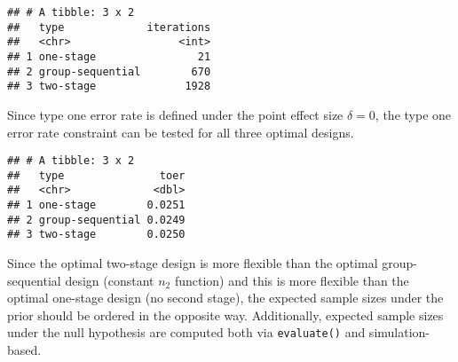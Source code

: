 \documentclass[]{book}
\newenvironment{Shaded}{\begin{snugshade}}{\end{snugshade}}
\newcommand{\DataTypeTok}[1]{\textcolor[rgb]{0.13,0.29,0.53}{#1}}
\newcommand{\DecValTok}[1]{\textcolor[rgb]{0.00,0.00,0.81}{#1}}
\newcommand{\FloatTok}[1]{\textcolor[rgb]{0.00,0.00,0.81}{#1}}
\newcommand{\KeywordTok}[1]{\textcolor[rgb]{0.13,0.29,0.53}{\textbf{#1}}}
\newcommand{\NormalTok}[1]{#1}
\newcommand{\OperatorTok}[1]{\textcolor[rgb]{0.81,0.36,0.00}{\textbf{#1}}}
\newcommand{\StringTok}[1]{\textcolor[rgb]{0.31,0.60,0.02}{#1}}
\begin{document}
\begin{verbatim}
## # A tibble: 3 x 2
##   type             iterations
##   <chr>                 <int>
## 1 one-stage                21
## 2 group-sequential        670
## 3 two-stage              1928
\end{verbatim}

Since type one error rate is defined under the point effect size \(\delta=0\),
the type one error rate constraint can be tested for all three optimal designs.

\begin{Shaded}
\end{Shaded}

\begin{verbatim}
## # A tibble: 3 x 2
##   type               toer
##   <chr>             <dbl>
## 1 one-stage        0.0251
## 2 group-sequential 0.0249
## 3 two-stage        0.0250
\end{verbatim}

Since the optimal two-stage design is more flexible than the optimal
group-sequential design (constant \(n_2\) function) and this is
more flexible than the optimal one-stage design (no second stage),
the expected sample sizes under the prior should be ordered in the opposite way.
Additionally, expected sample sizes under the null hypothesis
are computed both via \texttt{evaluate()} and simulation-based.
\end{document}
